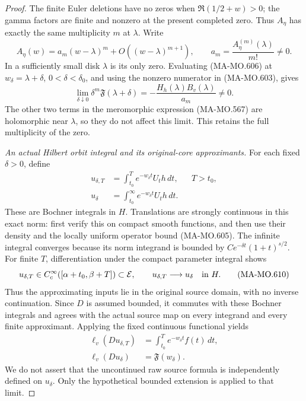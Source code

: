 \begin{proof}
The finite Euler deletions have no zeros when
\(\Re(1/2+w)>0\); the gamma factors are finite and
nonzero at the present completed zero. Thus \(A_\eta\)
has exactly the same multiplicity \(m\) at \(\lambda\).
Write
\[
 A_\eta(w)=a_m(w-\lambda)^m+
                      O((w-\lambda)^{m+1}),\qquad
 a_m=\frac{A_\eta^{(m)}(\lambda)}{m!}\ne0 .
 \tag{MA-MO.607}
\]
In a sufficiently small disk \(\lambda\) is its only
zero. Evaluating (MA-MO.606) at
\(w_\delta=\lambda+\delta\), \(0<\delta<\delta_0\),
and using the nonzero numerator in (MA-MO.603), gives
\[
 \lim_{\delta\downarrow0}
       \delta^m\mathfrak F(\lambda+\delta)
       =-\frac{H_h(\lambda)B_v(\lambda)}{a_m}\ne0 .
 \tag{MA-MO.608}
\]
The other two terms in the meromorphic expression
(MA-MO.567) are holomorphic near \(\lambda\), so they
do not affect this limit. This retains the full
multiplicity of the zero.

\emph{An actual Hilbert orbit integral and its original-core
approximants.}
For each fixed \(\delta>0\), define
\[
 \begin{aligned}
 u_{\delta,T}
     &=\int_{t_0}^{T}e^{-w_\delta t}U_th\,dt,
                         &&T>t_0,\\
 u_\delta
     &=\int_{t_0}^{\infty}e^{-w_\delta t}U_th\,dt .
 \end{aligned}
 \tag{MA-MO.609}
\]
These are Bochner integrals in \(H\).
Translations are strongly continuous in this exact norm:
first verify this on compact smooth functions, and then
use their density and the locally uniform operator bound
(MA-MO.605). The infinite integral converges because
its norm integrand is bounded by
\(C e^{-\delta t}(1+t)^{s/2}\).
For finite \(T\), differentiation under the compact
parameter integral shows
\[
 u_{\delta,T}\in C_c^\infty
                 ([\alpha+t_0,\beta+T])\subset\mathcal E,
 \qquad
 u_{\delta,T}\longrightarrow u_\delta\quad\hbox{in }H .
 \tag{MA-MO.610}
\]
Thus the approximating inputs lie in the original
source domain, with no inverse continuation.
Since \(D\) is assumed bounded, it commutes with these
Bochner integrals and agrees with the actual source map
on every integrand and every finite approximant.
Applying the fixed continuous functional yields
\[
 \begin{aligned}
 \ell_v(Du_{\delta,T})
       &=\int_{t_0}^{T}e^{-w_\delta t}f(t)\,dt,\\
 \ell_v(Du_\delta)&=\mathfrak F(w_\delta).
 \end{aligned}
 \tag{MA-MO.611}
\]
We do not assert that the uncontinued raw source formula
is independently defined on \(u_\delta\). Only the
hypothetical bounded extension is applied to that limit.


\end{proof}
